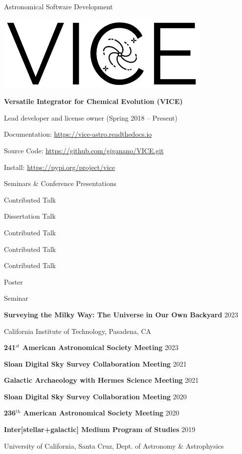 \documentclass[cv.tex]{subfiles}
\begin{document}
\vspace{5mm}
\noindent
{%
{\color{themecolor}\large Astronomical Software Development}
\par\noindent
\parbox{0.35\textwidth}{%
	\centering
	\includegraphics[scale = 0.33]{vice-logo.png}
}
\parbox{0.63\textwidth}{%
	\textbf{Versatile Integrator for Chemical Evolution (VICE)} \par
	Lead developer and license owner (Spring 2018 -- Present) \par
	Documentation: \url{https://vice-astro.readthedocs.io} \par
	Source Code: \url{https://github.com/giganano/VICE.git} \par
	Install: \url{https://pypi.org/project/vice}
}
}

\vspace{5mm}
\noindent
{\color{themecolor} \large Seminars \& Conference Presentations}
\vspace{1mm}
\par\noindent
\parbox{0.18\textwidth}{%

	\raggedleft
	Contributed Talk \par
	\null \par
	Dissertation Talk \par
	Contributed Talk \par
	Contributed Talk \par
	Contributed Talk \par
	Poster \par
	Seminar \par
	\null \par

}
\hspace{1mm}
\parbox{0.8\textwidth}{%
	\vspace{1mm}

	\textbf{Surveying the Milky Way: The Universe in Our Own Backyard}
	\hfill 2023 \par
	California Institute of Technology, Pasadena, CA \par
	\textbf{241$^\text{st}$ American Astronomical Society Meeting}
	\hfill 2023 \par
	\textbf{Sloan Digital Sky Survey Collaboration Meeting}
	\hfill 2021 \par
	\textbf{Galactic Archaeology with Hermes Science Meeting}
	\hfill 2021 \par
	\textbf{Sloan Digital Sky Survey Collaboration Meeting}
	\hfill 2020 \par
	\textbf{236$^\text{th}$ American Astronomical Society Meeting}
	\hfill 2020 \par
	\textbf{Inter[stellar+galactic] Medium Program of Studies}
	\hfill 2019 \par
	University of California, Santa Cruz, Dept. of Astronomy \& Astrophysics
	\par

}
\end{document}
